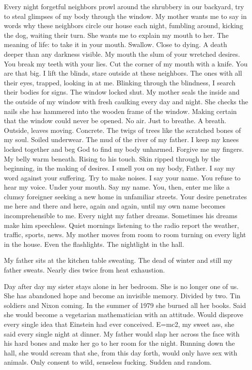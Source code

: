 \documentclass[
]{memoir}
\begin{document}
Every night forgetful neighbors prowl around the shrubbery in our
backyard, try to steal glimpses of my body through the window. My mother
wants me to say in words why these neighbors circle our house each
night, fumbling around, kicking the dog, waiting their turn. She wants
me to explain my mouth to her. The meaning of life: to take it in your
mouth. Swallow. Close to dying. A death deeper than any darkness
visible. My mouth the slum of your wretched desires. You break my teeth
with your lies. Cut the corner of my mouth with a knife. You are that
big. I lift the blinds, stare outside at these neighbors. The ones with
all their eyes, trapped, looking in at me. Blinking through the
blindness, I search their bodies for signs. The window locked shut. My
mother seals the inside and the outside of my window with fresh caulking
every day and night. She checks the nails she has hammered into the
wooden frame of the window. Making certain that the window could never
be opened. No air. Just to breathe. A breath. Outside, leaves moving.
Concrete. The twigs of trees like the scratched bones of my soul. Soiled
underwear. The mud of the river of my father. I keep my knees locked
together and beg God to find my body unharmed. Forgive me my fingers. My
belly warm beneath. Rising to his touch. Skin ripped through by the
beginning, in the making of desires. I smell you on my body, Father. I
say my word against your suffering. Try to make noises. I say your name.
You refuse to hear my voice. Under your mouth. Say my name. You, then,
enter me like a clumsy foreigner seeking a new home in unfamiliar
streets. Your desire penetrates me here and there and here, again and
again, until my own name becomes incomprehensible to me. Every night my
father dreams. Sometimes his dreams make him speechless. Quiet mornings
listening to the radio report the weather, traffic, sports, news. My
mother moves from room to room turning on every light in the house. Even
the flashlights. The nightlight in the hall.

My father sits at the kitchen table sweating. The dead of winter and
still my father sweats. Nearly dies twice from heat exhaustion.

Day after day my sister stays alone in her bedroom. She is no longer one
of us. She has abandoned hope and become an invisible memory. Divided by
two. Tin soldiers and Nixon coming. In the summer of 1979 she burned all
her books. Said she would become a vegetarian mathematician with an
attitude. Would disprove every single idea that Einstein had ever
conceived. E=mc2, my sweet ass, she said every single night at dinner.
My father would slap her across the face with his hard bones and make
her go to her room for the night. Running down the hall, she would
scream that she, from this day forth, would only have sex with animals.
Only consent to wild, senseless fucking. Sudden and random.
\end{document}
